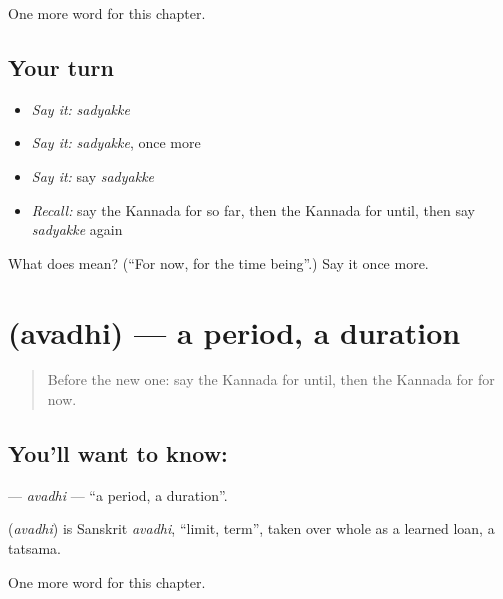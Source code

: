 \begin{grammarlens}[title={What you've built}]
One more word for this chapter.
\end{grammarlens}

\subsection*{Your turn}
\begin{itemize}
\raggedright
  \item \emph{Say it:} \emph{sadyakke}
  \item \emph{Say it:} \emph{sadyakke}, once more
  \item \emph{Say it:} say \emph{sadyakke}
  \item \emph{Recall:} say the Kannada for so far, then the Kannada for until, then say \emph{sadyakke} again
\end{itemize}

\begin{tcolorbox}[breakable,colback=teal!4,colframe=teal!35!black,title={Before you move on}]
What does  mean? (\textquotedblleft{}For now, for the time being\textquotedblright{}.) Say it once more.
\end{tcolorbox}
\section[\texorpdfstring{\kn{ಅವಧಿ} (avadhi)}{ಅವಧಿ (avadhi)}]{ (avadhi) — a period, a duration}

\label{lesson:KA-C211-avadhi}



\begin{quote}
Before the new one: say the Kannada for until, then the Kannada for for now.
\end{quote}

\subsection*{You'll want to know: }
\textbf{} — \emph{avadhi} — \textquotedblleft{}a period, a duration\textquotedblright{}.

\begin{cousinweb}
\textbf{} (\emph{avadhi}) is Sanskrit \emph{avadhi}, \textquotedblleft{}limit, term\textquotedblright{}, taken over whole as a learned loan, a tatsama.
\end{cousinweb}

\begin{grammarlens}[title={What you've built}]
One more word for this chapter.
\end{grammarlens}

